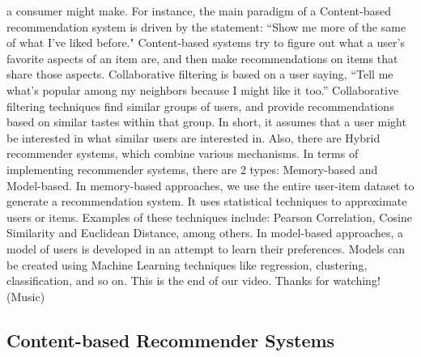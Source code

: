 a consumer might make. For instance, the main paradigm of a Content-based recommendation system is driven by the statement: “Show me more of the same of what I've liked before." Content-based systems try to figure out what a user's favorite aspects of an item are, and then make recommendations on items that share those aspects. Collaborative filtering is based on a user saying, “Tell me what's popular among my neighbors because I might like it too.” Collaborative filtering techniques find similar groups of users, and provide recommendations based on similar tastes within that group. In short, it assumes that a user might be interested in what similar users are interested in. Also, there are Hybrid recommender systems, which combine various mechanisms. In terms of implementing recommender systems, there are 2 types: Memory-based and Model-based. In memory-based approaches, we use the entire user-item dataset to generate a recommendation system. It uses statistical techniques to approximate users or items. Examples of these techniques include: Pearson Correlation, Cosine Similarity and Euclidean Distance, among others. In model-based approaches, a model of users is developed in an attempt to learn their preferences. Models can be created using Machine Learning techniques like regression, clustering, classification, and so on. This is the end of our video. Thanks for watching! (Music)
	
	\subsection{Content-based Recommender Systems}	
	
